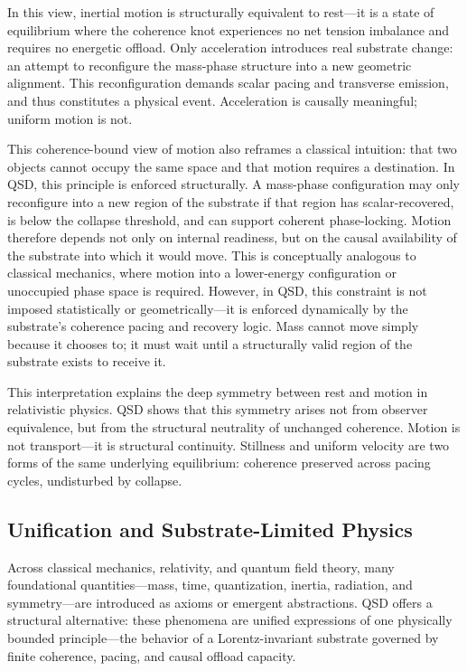 \documentclass[entropy,article,submit,pdftex,oneauthor]{Definitions/mdpi}
\begin{document}
In this view, inertial motion is structurally equivalent to rest—it is a state of equilibrium where the coherence knot experiences no net tension imbalance and requires no energetic offload. Only acceleration introduces real substrate change: an attempt to reconfigure the mass-phase structure into a new geometric alignment. This reconfiguration demands scalar pacing and transverse emission, and thus constitutes a physical event. Acceleration is causally meaningful; uniform motion is not.

This coherence-bound view of motion also reframes a classical intuition: that two objects cannot occupy the same space and that motion requires a destination. In QSD, this principle is enforced structurally. A mass-phase configuration may only reconfigure into a new region of the substrate if that region has scalar-recovered, is below the collapse threshold, and can support coherent phase-locking. Motion therefore depends not only on internal readiness, but on the causal availability of the substrate into which it would move. This is conceptually analogous to classical mechanics, where motion into a lower-energy configuration or unoccupied phase space is required. However, in QSD, this constraint is not imposed statistically or geometrically—it is enforced dynamically by the substrate’s coherence pacing and recovery logic. Mass cannot move simply because it chooses to; it must wait until a structurally valid region of the substrate exists to receive it.

This interpretation explains the deep symmetry between rest and motion in relativistic physics. QSD shows that this symmetry arises not from observer equivalence, but from the structural neutrality of unchanged coherence. Motion is not transport—it is structural continuity. Stillness and uniform velocity are two forms of the same underlying equilibrium: coherence preserved across pacing cycles, undisturbed by collapse.


\subsection{Unification and Substrate-Limited Physics}

Across classical mechanics, relativity, and quantum field theory, many foundational quantities—mass, time, quantization, inertia, radiation, and symmetry—are introduced as axioms or emergent abstractions. QSD offers a structural alternative: these phenomena are unified expressions of one physically bounded principle—the behavior of a Lorentz-invariant substrate governed by finite coherence, pacing, and causal offload capacity.
\end{document}
